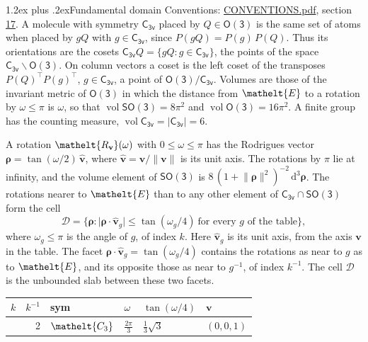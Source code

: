 \documentclass[10pt,a4paper]{article}
\makeatletter
\renewcommand\section{\@startsection{section}{1}{\z@}{-3ex plus -1ex minus -.2ex}%
  {1.2ex plus .2ex}{\normalfont\large\sffamily\bfseries\color{parttitle}}}
\numberwithin{equation}{section}
\newcommand{\eltfont}[1]{{\let\sigma\eltsigma\mathelt{#1}}}
\newcommand{\grp}[1]{\mathsf{#1}}
\newcommand{\cls}[1]{\eltfont{#1}}
\newcommand{\elt}[1]{\eltfont{#1}}
\newcommand{\dirvec}[3]{(#1, #2, #3)}
\newcommand{\unitaxis}{\hat{\mathbf{v}}}
\newcommand{\vv}{\mathbf{v}}
\newcommand{\diff}{\mathrm{d}}
\newcommand{\vol}{\operatorname{vol}}
\newcommand{\rodrigues}{\boldsymbol{\rho}}
\newcommand{\fcell}{\mathcal{D}}
\makeatother
\begin{document}
\section{Fundamental domain}\label{s:fundamental_domain}
Conventions: \href{../../CONVENTIONS.pdf}{CONVENTIONS.pdf}, section \href{../../CONVENTIONS.pdf\#conv.17}{17}.
\leavevmode\label{n:element.placement}A molecule with symmetry $\grp{C_{3v}}$ placed by $Q \in \grp{O(3)}$ is the same set of atoms when placed by $gQ$ with $g \in \grp{C_{3v}}$, since $P(gQ) = P(g)\,P(Q)$. \label{n:operator.cosets}Thus its orientations are the cosets $\grp{C_{3v}}Q = \{gQ : g \in \grp{C_{3v}}\}$, the points of the space $\grp{C_{3v}}\backslash\grp{O(3)}$. On column vectors a coset is the left coset of the transposes $P(Q)^{\top}P(g)^{\top}$, $g \in \grp{C_{3v}}$, a point of $\grp{O(3)}/\grp{C_{3v}}$.
\leavevmode\label{n:operator.volume}Volumes are those of the invariant metric of \href{O3.pdf}{$\grp{O(3)}$} in which the distance from $\elt{E}$ to a rotation by $\omega \le \pi$ is $\omega$, so that $\vol\grp{SO(3)} = 8\pi^2$ and $\vol\grp{O(3)} = 16\pi^2$. A finite group has the counting measure, $\vol\grp{C_{3v}} = |\grp{C_{3v}}| = 6$.

\leavevmode\label{n:vector.rodrigues}\label{n:vector.unitaxis}A rotation $\elt{R_{\vv}}(\omega)$ with $0 \le \omega \le \pi$ has the Rodrigues vector $\rodrigues = \tan(\omega/2)\,\unitaxis$, where $\unitaxis = \vv/\lVert\vv\rVert$ is its unit axis. The rotations by $\pi$ lie at infinity, and the volume element of \href{SO3.pdf}{$\grp{SO(3)}$} is $8\,(1 + \lVert\rodrigues\rVert^2)^{-2}\,\diff^3\rodrigues$.
\leavevmode\label{n:set.cell}The rotations nearer to $\elt{E}$ than to any other element of $\grp{C_{3v}} \cap \grp{SO(3)}$ form the cell
\begin{equation}\label{e:cell}\fcell = \bigl\{\rodrigues : \lvert\rodrigues\cdot\unitaxis_g\rvert \le \tan(\omega_g/4)\ \text{for every $g$ of the table}\bigr\},\end{equation}
where $\omega_g \le \pi$ is the angle of $g$, of index $k$. Here $\unitaxis_g$ is its unit axis, from the axis $\vv$ in the table. The facet $\rodrigues\cdot\unitaxis_g = \tan(\omega_g/4)$ contains the rotations as near to $g$ as to $\elt{E}$, and its opposite those as near to $g^{-1}$, of index $k^{-1}$. The cell $\fcell$ is the unbounded slab between these two facets.
{\small{\renewcommand{\arraystretch}{1.3}\begin{longtable}{@{}rrllll@{}}\toprule
$k$ & $k^{-1}$ & sym & $\omega$ & $\tan(\omega/4)$ & $\vv$\\\midrule\endhead
\bottomrule\endfoot\endlastfoot
1 & 2 & $\cls{C_{3}}$ & $\tfrac{2\pi}{3}$ & $\tfrac{1}{3}\sqrt{3}$ & $\dirvec{0}{0}{1}$\\
\bottomrule\end{longtable}}}
\end{document}
